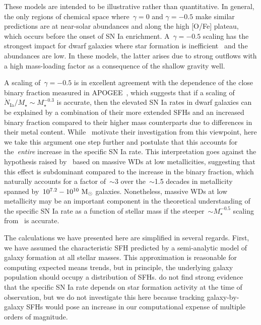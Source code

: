 \documentclass[ms.tex]{subfiles}
\begin{document}
\par
These models are intended to be illustrative rather than quantitative.
In general, the only regions of chemical space where~$\gamma = 0$ and
$\gamma = -0.5$ make similar predictions are at near-solar abundances and along
the high [O/Fe] plateau, which occurs before the onset of SN Ia enrichment.
A~$\gamma = -0.5$ scaling has the strongest impact for dwarf galaxies where
star formation is inefficient~\citep[e.g.][]{Hudson2015} and the abundances are
low.
In these models, the latter arises due to strong outflows with a high
mass-loading factor as a consequence of the shallow gravity well.
\par
A scaling of~$\gamma = -0.5$ is in excellent agreement with the dependence of
the close binary fraction measured in APOGEE~\citep{Moe2019}, which suggests
that if a scaling of~$\dot{N}_\text{Ia} / M_\star \sim M_\star^{-0.3}$ is
accurate, then the elevated SN Ia rates in dwarf galaxies can be explained by a
combination of their more extended SFHs and an increased binary fraction
compared to their higher mass counterparts due to differences in their metal
content.
While~\citet{Gandhi2022} motivate their investigation from this viewpoint, here
we take this argument one step further and postulate that this accounts for
the~\textit{entire} increase in the specific SN Ia rate.
This interpretation goes against the hypothesis raised by~\citet{Kistler2013}
based on massive WDs at low metallicities, suggesting that this effect is
subdominant compared to the increase in the binary fraction, which naturally
accounts for a factor of~$\sim$3 over the~$\sim$1.5 decades in metallicity
spanned by~$10^{7.2} - 10^{10}~\text{M}_\odot$ galaxies.
Nonetheless, massive WDs at low metallicity may be an important component in
the theoretical understanding of the specific SN Ia rate as a function of
stellar mass if the steeper~$\sim M_\star^{-0.5}$ scaling from~\citet{Brown2019}
is accurate.
\par
The calculations we have presented here are simplified in several regards.
First, we have assumed the characteristic SFH predicted by a semi-analytic
model of galaxy formation at all stellar masses.
This approximation is reasonable for computing expected means trends, but in
principle, the underlying galaxy population should occupy a distribution of
SFHs.
\citet{Brown2019} do not find strong evidence that the specific SN Ia rate
depends on star formation activity at the time of observation, but we do not
investigate this here because tracking galaxy-by-galaxy SFHs would pose an
increase in our computational expense of multiple orders of magnitude.
\end{document}
